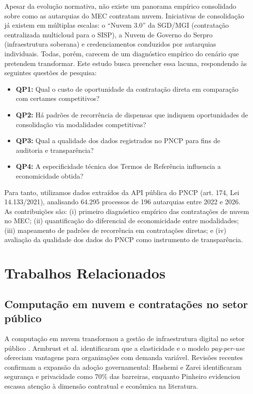\documentclass[12pt]{article}
\begin{document}
Apesar da evolução normativa, não existe um panorama empírico consolidado sobre como as autarquias do MEC contratam nuvem. Iniciativas de consolidação já existem em múltiplas escalas: o ``Nuvem 3.0'' da SGD/MGI (contratação centralizada multicloud para o SISP), a Nuvem de Governo do Serpro (infraestrutura soberana) e credenciamentos conduzidos por autarquias individuais. Todas, porém, carecem de um diagnóstico empírico do cenário que pretendem transformar. Este estudo busca preencher essa lacuna, respondendo às seguintes questões de pesquisa:

\begin{itemize}
\item \textbf{QP1:} Qual o custo de oportunidade da contratação direta em comparação com certames competitivos?
\item \textbf{QP2:} Há padrões de recorrência de dispensas que indiquem oportunidades de consolidação via modalidades competitivas?
\item \textbf{QP3:} Qual a qualidade dos dados registrados no PNCP para fins de auditoria e transparência?
\item \textbf{QP4:} A especificidade técnica dos Termos de Referência influencia a economicidade obtida?
\end{itemize}

Para tanto, utilizamos dados extraídos da API pública do PNCP (art. 174, Lei 14.133/2021), analisando 64.295 processos de 196 autarquias entre 2022 e 2026. As contribuições são: (i) primeiro diagnóstico empírico das contratações de nuvem no MEC; (ii) quantificação do diferencial de economicidade entre modalidades; (iii) mapeamento de padrões de recorrência em contratações diretas; e (iv) avaliação da qualidade dos dados do PNCP como instrumento de transparência.

\section{Trabalhos Relacionados}
\label{sec:relacionados}

\subsection{Computação em nuvem e contratações no setor público}

A computação em nuvem transformou a gestão de infraestrutura digital no setor público \cite{mell2011nist}. Armbrust et al. \cite{armbrust2010above} identificaram que a elasticidade e o modelo \textit{pay-per-use} ofereciam vantagens para organizações com demanda variável. Revisões recentes confirmam a expansão da adoção governamental: Hashemi e Zarei \cite{hashemi2024cloud_security} identificaram segurança e privacidade como 70\% das barreiras, enquanto Pinheiro \cite{pinheiro2020cloudgov} evidenciou escassa atenção à dimensão contratual e econômica na literatura.
\end{document}
